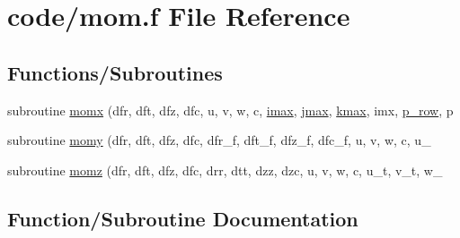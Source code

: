 \hypertarget{mom_8f}{}\section{code/mom.f File Reference}
\label{mom_8f}
\subsection*{Functions/\+Subroutines}
\begin{DoxyCompactItemize}
\item 
subroutine \hyperlink{mom_8f_a77c0df3e763bd0428b677445d3f96c0d}{momx} (dfr, dft, dfz, dfc, u, v, w, c, \hyperlink{param_8h_a788916a7426baf172c67386359720d6d}{imax}, \hyperlink{param_8h_ac5c80d846ec0c4cf1c91fc5d9d66faa1}{jmax}, \hyperlink{param_8h_ae0453dd20a7c6a923904df942ef82468}{kmax}, imx, \hyperlink{param_8h_a149afb59990224def797b29467985bac}{p\+\_\+row}, p
\item 
subroutine \hyperlink{mom_8f_a2cf462b1b66d8b56bfdb3abdad11af1e}{momy} (dfr, dft, dfz, dfc, dfr\+\_\+f, dft\+\_\+f, dfz\+\_\+f, dfc\+\_\+f, u, v, w, c, u\+\_\+
\item 
subroutine \hyperlink{mom_8f_a0c1fdcea9abff746500b08754413c560}{momz} (dfr, dft, dfz, dfc, drr, dtt, dzz, dzc, u, v, w, c, u\+\_\+t, v\+\_\+t, w\+\_\+
\end{DoxyCompactItemize}


\subsection{Function/\+Subroutine Documentation}
\mbox{\label{mom_8f_a77c0df3e763bd0428b677445d3f96c0d}} 

